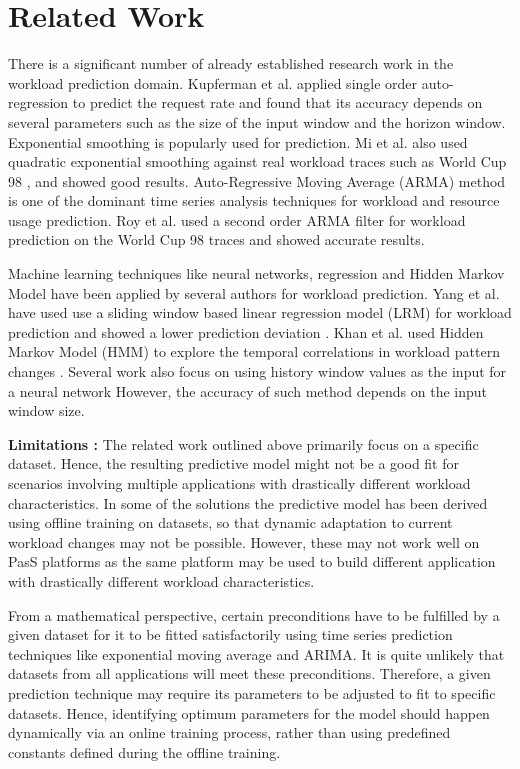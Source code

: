 \section{Related Work}

There is a significant number of already established research work in the workload prediction domain.  Kupferman et al. \cite{Kupferman_2009} applied single order auto-regression to predict the request rate and found that its accuracy depends on several parameters such as the size of the input window and the horizon window. Exponential smoothing is popularly used for prediction. Mi et al. \cite{Mi_2010} also used quadratic exponential smoothing against real workload traces such as World Cup 98 \cite{WorldCup_1998}, and showed good results. Auto-Regressive Moving Average (ARMA) method is one of the dominant time series analysis techniques for workload and resource usage prediction. Roy et al. \cite{Roy_2011} used a second order ARMA filter for workload prediction on the World Cup 98 traces and showed accurate results.  

Machine learning techniques like neural networks, regression and Hidden Markov Model have been applied by several authors for workload prediction. Yang et al.\cite{Yang_2013} have used use a sliding window based linear regression model (LRM) for workload prediction and showed a lower prediction deviation  . Khan et al. \cite{Khan_2012} used Hidden Markov Model (HMM) to explore the temporal correlations in workload pattern changes . Several work also focus on using history window values as the input for a neural network \cite{Islam_2012} However, the accuracy of such method depends on the input window size.



\textbf{Limitations :} The related work outlined above primarily focus on a specific dataset. Hence, the resulting predictive model might not be a good fit for scenarios involving multiple applications with drastically different workload characteristics. In some of the solutions the predictive model has been derived using offline training on datasets, so that dynamic adaptation to current workload changes may not be possible. However, these may not work well on PasS platforms as the same platform may be used to build different application with drastically different workload characteristics.

From a mathematical perspective, certain preconditions have to be fulfilled by a given dataset for it to be fitted satisfactorily using time series prediction techniques like exponential moving average and ARIMA. It is quite unlikely that datasets from all applications will meet these preconditions. Therefore, a given prediction technique may require its parameters to be adjusted to fit to specific datasets. Hence, identifying optimum parameters for the model should happen dynamically via an online training process, rather than using predefined constants defined during the offline training.